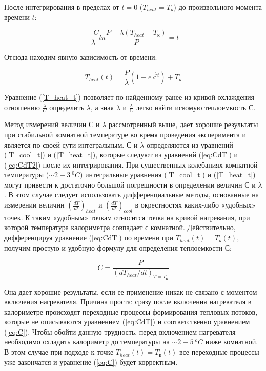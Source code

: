 \documentclass[a4paper, 12pt]{article}
\begin{document}
            После интегрирования в пределах от $t = 0$ ($T_{heat} = T_к$) до произвольного момента времени $t$:

            \begin{equation}
                \frac{-C}{\lambda} ln \frac{P - \lambda (T_{heat} - T_{к})}{P} = t
                \label{eq:diff_integral2}
            \end{equation}

            Отсюда находим явную зависимость от времени:

            \begin{equation}
                T_{heat}(t) = \frac{P}{\lambda} (1 - e^{\frac{-\lambda}{C} t}) + T_к
                \label{T_heat_t}
            \end{equation}

            Уравнение (\ref{T_heat_t}) позволяет по найденному ранее из кривой охлаждения отношению $\frac{\lambda}{C}$ определить $\lambda$, а зная $\lambda$ и $\frac{\lambda}{C}$ легко найти искомую теплоемкость $С$.

            Метод измерений величин $С$ и $\lambda$ рассмотренный выше, дает хорошие результаты при стабильной комнатной температуре во время проведения эксперимента и является по своей сути интегральным. $С$ и $\lambda$ определяются из уравнений (\ref{T_cool_t}) и (\ref{T_heat_t}), которые следуют из уравнений (\ref{eq:CdT}) и (\ref{eq:CdT2}) после их интегрирования. При существенных колебаниях комнатной температуры ($\sim 2-3~^0C$) интегральные уравнения (\ref{T_cool_t}) и (\ref{T_heat_t}) могут привести к достаточно большой погрешности в определении величин $С$ и $\lambda$. В этом случае следует использовать дифференциальные методы, основанные на измерении величин $\left( \frac{dT}{dt} \right)_{heat}$ и $\left( \frac{dT}{dt} \right)_{cool}$ в окрестностях каких-либо «удобных» точек. К таким «удобным» точкам относится точка на кривой нагревания, при которой температура калориметра совпадает с комнатной. Действительно, дифференцируя уравнение (\ref{eq:CdT}) по времени при $T_{heat}(t) = T_к(t)$, получим простую и удобную формулу для определения теплоемкости $С$:

            \begin{equation}
                C = \frac{P}{(dT_{heat} / dt)_{T = T_к}}
                \label{eq:C}
            \end{equation}

            Она дает хорошие результаты, если ее применение никак не связано с моментом включения нагревателя. Причина проста: сразу после включения нагревателя в калориметре происходят переходные процессы формирования тепловых потоков, которые не описываются уравнением (\ref{eq:CdT}) и соответственно уравнением (\ref{eq:C}). Чтобы обойти данную трудность, перед включением нагревателя необходимо охладить калориметр до температуры на $\sim 2-5~^oC$ ниже комнатной. В этом случае при подходе к точке $T_{heat}(t) = T_к(t)$ все переходные процессы уже закончатся и уравнение (\ref{eq:C}) будет корректным.
\end{document}
